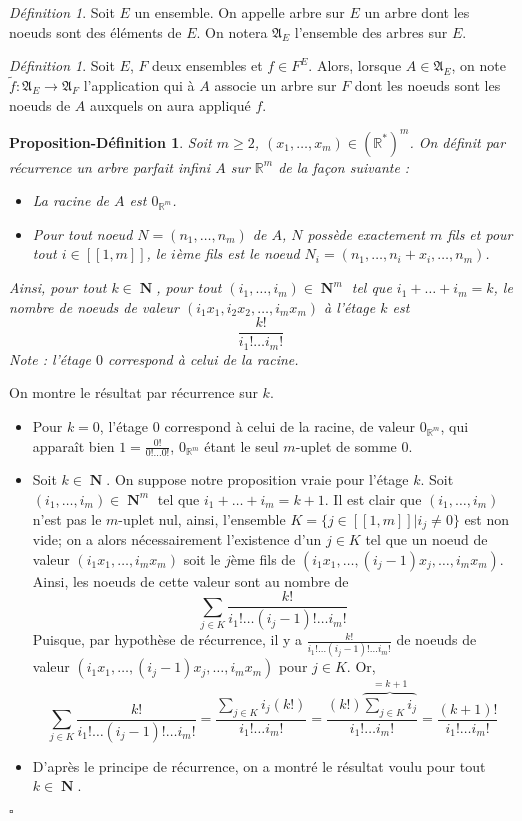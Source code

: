 \documentclass[a4paper,12pt,reqno]{amsart}
\newtheorem{propdef}[theorem]{Proposition-Définition}
\theoremstyle{remark}
\newtheorem{définition}[theorem]{Définition}
\numberwithin{equation}{section}
\DeclareMathOperator{\N}{\mathbf{N}}
\newcommand{\R}{\mathbb{R}}
\renewcommand{\geq}{\geqslant}
\renewenvironment{proof}{{\textit{Preuve} }}{\hfill $\square$ \\}
\begin{document}
\begin{définition}
Soit $E$ un ensemble. On appelle arbre sur $E$ un arbre dont les noeuds sont des éléments de $E$. On notera $\mathfrak A_E$ l'ensemble des arbres sur $E$.
\end{définition}

\begin{définition}
Soit $E$, $F$ deux ensembles et $f\in F^E$. Alors, lorsque $A\in \mathfrak A_E$, on note $\tilde{f}:\mathfrak A_E\to\mathfrak A_F$ l'application qui à $A$ associe un arbre sur $F$ dont les noeuds sont les noeuds de $A$ auxquels on aura appliqué $f$.
\end{définition}

\begin{propdef}
Soit $m\geq 2$, $(x_1,\dots,x_m)\in(\R^*)^m$. On définit par récurrence un arbre parfait infini $A$ sur $\R^m$ de la façon suivante :
\begin{itemize}
	\item La racine de $A$ est $0_{\R^m}$.
	\item Pour tout noeud $N=(n_1,\dots,n_m)$ de $A$, $N$ possède exactement $m$ fils et pour tout $i\in[\![1,m]\!]$, le $i$ème fils est le noeud $N_i=(n_1,\dots,n_i+x_i,\dots,n_m)$.
\end{itemize}
Ainsi, pour tout $k\in\N$, pour tout $(i_1,\dots,i_m)\in\N^m$ tel que $i_1+\dots+i_m=k$, le nombre de noeuds de valeur $(i_1x_1,i_2x_2,\dots,i_mx_m)$ à l'étage $k$ est \[\frac{k!}{i_1!\dots i_m!}\]
Note : l'étage $0$ correspond à celui de la racine.
\end{propdef}

\begin{proof}
On montre le résultat par récurrence sur $k$.
\begin{itemize}
	\item Pour $k=0$, l'étage $0$ correspond à celui de la racine, de valeur $0_{\R^m}$, qui apparaît bien $1=\frac{0!}{0!\dots 0!}$, $0_{\R^m}$ étant le seul $m$-uplet de somme $0$.
	\item Soit $k\in\N$. On suppose notre proposition vraie pour l'étage $k$. Soit $(i_1,\dots,i_m)\in\N^m$ tel que $i_1+\dots+i_m=k+1$. Il est clair que $(i_1,\dots,i_m)$ n'est pas le $m$-uplet nul, ainsi, l'ensemble $K=\lbrace j\in[\![1,m]\!]|i_j\neq 0\rbrace$ est non vide; on a alors nécessairement l'existence d'un $j\in K$ tel que un noeud de valeur $(i_1x_1,\dots,i_mx_m)$ soit le $j$ème fils de $(i_1x_1,\dots,(i_j-1)x_j,\dots,i_mx_m)$. Ainsi, les noeuds de cette valeur sont au nombre de \[\sum_{j\in K}\frac{k!}{i_1!\dots(i_j-1)!\dots i_m!}\]
	Puisque, par hypothèse de récurrence, il y a $\frac{k!}{i_1!\dots(i_j-1)!\dots i_m!}$ de noeuds de valeur $(i_1x_1,\dots,(i_j-1)x_j,\dots,i_mx_m)$ pour $j\in K$. Or,
	\[\sum_{j\in K}\frac{k!}{i_1!\dots(i_j-1)!\dots i_m!}=\frac{\sum_{j\in K}i_j(k!)}{i_1!\dots i_m!}=\frac{(k!)\overbrace{\sum_{j\in K}i_j}^{=k+1}}{i_1!\dots i_m!}=\frac{(k+1)!}{i_1!\dots i_m!}\]
	\item D'après le principe de récurrence, on a montré le résultat voulu pour tout $k\in \N$.
\end{itemize}
\end{proof}
\end{document}
